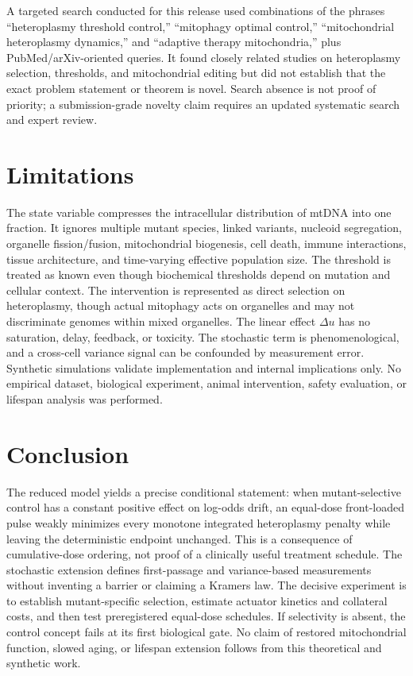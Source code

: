 \documentclass[11pt]{article}
\begin{document}
A targeted search conducted for this release used combinations of the phrases ``heteroplasmy threshold control,'' ``mitophagy optimal control,'' ``mitochondrial heteroplasmy dynamics,'' and ``adaptive therapy mitochondria,'' plus PubMed/arXiv-oriented queries. It found closely related studies on heteroplasmy selection, thresholds, and mitochondrial editing but did not establish that the exact problem statement or theorem is novel. Search absence is not proof of priority; a submission-grade novelty claim requires an updated systematic search and expert review.

\section{Limitations}
The state variable compresses the intracellular distribution of mtDNA into one fraction. It ignores multiple mutant species, linked variants, nucleoid segregation, organelle fission/fusion, mitochondrial biogenesis, cell death, immune interactions, tissue architecture, and time-varying effective population size. The threshold is treated as known even though biochemical thresholds depend on mutation and cellular context. The intervention is represented as direct selection on heteroplasmy, though actual mitophagy acts on organelles and may not discriminate genomes within mixed organelles. The linear effect $\Delta u$ has no saturation, delay, feedback, or toxicity. The stochastic term is phenomenological, and a cross-cell variance signal can be confounded by measurement error. Synthetic simulations validate implementation and internal implications only. No empirical dataset, biological experiment, animal intervention, safety evaluation, or lifespan analysis was performed.

\section{Conclusion}
The reduced model yields a precise conditional statement: when mutant-selective control has a constant positive effect on log-odds drift, an equal-dose front-loaded pulse weakly minimizes every monotone integrated heteroplasmy penalty while leaving the deterministic endpoint unchanged. This is a consequence of cumulative-dose ordering, not proof of a clinically useful treatment schedule. The stochastic extension defines first-passage and variance-based measurements without inventing a barrier or claiming a Kramers law. The decisive experiment is to establish mutant-specific selection, estimate actuator kinetics and collateral costs, and then test preregistered equal-dose schedules. If selectivity is absent, the control concept fails at its first biological gate. No claim of restored mitochondrial function, slowed aging, or lifespan extension follows from this theoretical and synthetic work.
\end{document}
